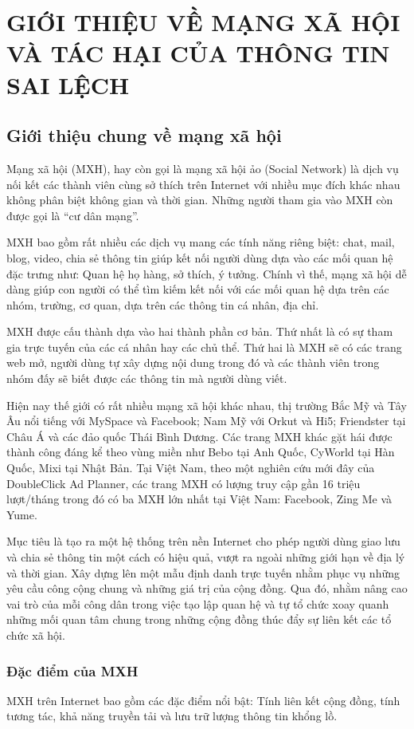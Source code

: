 \chapter{GIỚI THIỆU VỀ MẠNG XÃ HỘI VÀ TÁC HẠI CỦA THÔNG TIN SAI LỆCH }

\section{Giới thiệu chung về mạng xã hội}
Mạng xã hội (MXH), hay còn gọi là mạng xã hội ảo (Social Network) là dịch vụ nối kết các thành viên cùng sở thích trên Internet với nhiều mục đích khác nhau không phân biệt không gian và thời gian. Những người tham gia vào MXH còn được gọi là “cư dân mạng”. 

MXH bao gồm rất nhiều các dịch vụ mang các tính năng riêng biệt: chat, mail, blog, video, chia sẻ thông tin giúp kết nối người dùng dựa vào các mối quan hệ đặc trưng như: Quan hệ họ hàng, sở thích, ý tưởng. Chính vì thế, mạng xã hội dễ dàng giúp con người có thể tìm kiếm kết nối với các mối quan hệ dựa trên các nhóm, trường, cơ quan, dựa trên các thông tin cá nhân, địa chỉ. 

MXH được cấu thành dựa vào hai thành phần cơ bản. Thứ nhất là có sự tham gia trực tuyến của các cá nhân hay các chủ thể. Thứ hai là MXH sẽ có các trang web mở, người dùng tự xây dựng nội dung trong đó và các thành viên trong nhóm đấy sẽ biết được các thông tin mà người dùng viết.

Hiện nay thế giới có rất nhiều mạng xã hội khác nhau, thị trường Bắc Mỹ và Tây Âu nổi tiếng với MySpace và Facebook; Nam Mỹ với Orkut và Hi5; Friendster tại Châu Á và các đảo quốc Thái Bình Dương. Các  trang MXH khác gặt hái được thành công đáng kể theo vùng miền như Bebo tại Anh Quốc, CyWorld tại Hàn Quốc, Mixi tại Nhật Bản. Tại Việt Nam, theo một nghiên cứu mới đây của DoubleClick Ad Planner, các trang MXH có lượng truy cập gần 16 triệu lượt/tháng trong đó có ba MXH lớn nhất tại Việt Nam: Facebook, Zing Me và Yume.

Mục tiêu là tạo ra một hệ thống trên nền Internet cho phép người dùng giao lưu và chia sẻ thông tin một cách có hiệu quả, vượt ra ngoài những giới hạn về địa lý và thời gian. Xây dựng lên một mẫu định danh trực tuyến nhằm phục vụ những yêu cầu công cộng chung và những giá trị của cộng đồng. Qua đó, nhằm nâng cao vai trò của mỗi công dân trong việc tạo lập quan hệ và tự tổ chức xoay quanh những mối quan tâm chung trong những cộng đồng thúc đẩy sự liên kết các tổ chức xã hội.
	\subsection{Đặc điểm của MXH}
	MXH trên Internet bao gồm các đặc điểm nổi bật: Tính liên kết cộng đồng, tính tương tác, khả năng truyền tải và lưu trữ lượng thông tin khổng lồ.
